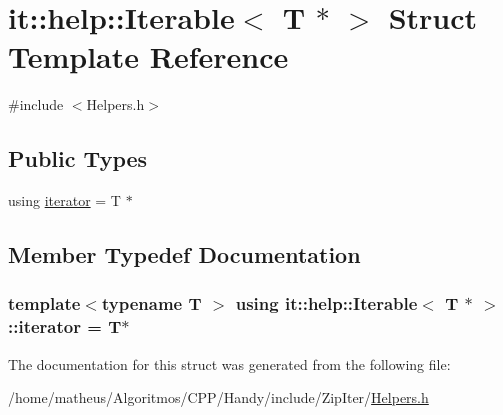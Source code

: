 \hypertarget{structit_1_1help_1_1Iterable_3_01T_01_5_01_4}{}\section{it\+:\+:help\+:\+:Iterable$<$ T $\ast$ $>$ Struct Template Reference}
\label{structit_1_1help_1_1Iterable_3_01T_01_5_01_4}


{\ttfamily \#include $<$Helpers.\+h$>$}

\subsection*{Public Types}
\begin{DoxyCompactItemize}
\item 
using \hyperlink{structit_1_1help_1_1Iterable_3_01T_01_5_01_4_a8358e383286cbe494802cbbac75fd894}{iterator} = T $\ast$
\end{DoxyCompactItemize}


\subsection{Member Typedef Documentation}
\subsubsection[{\texorpdfstring{iterator}{iterator}}]{\setlength{\rightskip}{0pt plus 5cm}template$<$typename T $>$ using {\bf it\+::help\+::\+Iterable}$<$ T $\ast$ $>$\+::{\bf iterator} =  T$\ast$}\hypertarget{structit_1_1help_1_1Iterable_3_01T_01_5_01_4_a8358e383286cbe494802cbbac75fd894}{}\label{structit_1_1help_1_1Iterable_3_01T_01_5_01_4_a8358e383286cbe494802cbbac75fd894}


The documentation for this struct was generated from the following file\+:\begin{DoxyCompactItemize}
\item 
/home/matheus/\+Algoritmos/\+C\+P\+P/\+Handy/include/\+Zip\+Iter/\hyperlink{ZipIter_2Helpers_8h}{Helpers.\+h}\end{DoxyCompactItemize}
